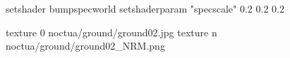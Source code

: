 setshader bumpspecworld
setshaderparam "specscale" 0.2 0.2 0.2

texture 0 noctua/ground/ground02.jpg
texture n noctua/ground/ground02_NRM.png
